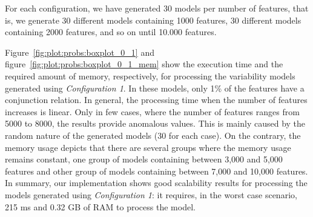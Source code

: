 For each configuration, we have generated 30 models per number of features, that is, we generate
30 different models containing 1000 features, 30 different models containing 2000 features,
and so on until 10.000 features.

Figure~\ref{fig:plot:probs:boxplot_0_1} and figure~\ref{fig:plot:probs:boxplot_0_1_mem} show the execution time and the required amount of memory, respectively, for processing the variability models generated using \textit{Configuration 1}. In these models, only 1\% of the features have a conjunction relation. In general, the processing time when the number of features increases is linear. Only in few cases, where the number of features ranges from 5000 to 8000, the results provide anomalous values. This is mainly caused by the random nature of the generated models (30 for each case). On the contrary, the memory usage depicts that there are several groups where the memory usage remains constant, one group of models containing between 3,000 and 5,000 features and other group of models containing between 7,000 and 10,000 features. In summary, our implementation shows good scalability results for processing the models generated using \textit{Configuration 1}: it requires, in the worst case scenario, 215 ms and 0.32 GB of RAM to process the model.

